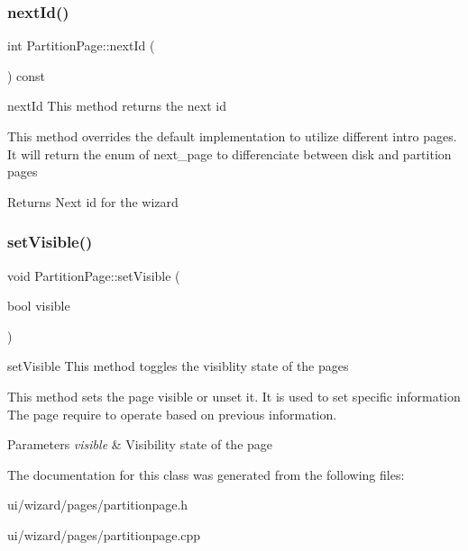 \subsubsection{\texorpdfstring{next\+Id()}{nextId()}}
{\footnotesize\ttfamily int Partition\+Page\+::next\+Id (\begin{DoxyParamCaption}{ }\end{DoxyParamCaption}) const\hspace{0.3cm}{\ttfamily [override]}}



next\+Id This method returns the next id 

This method overrides the default implementation to utilize different intro pages. It will return the enum of next\+\_\+page to differenciate between disk and partition pages \begin{DoxyReturn}{Returns}
Next id for the wizard 
\end{DoxyReturn}
\mbox{\label{classui_1_1wizard_1_1pages_1_1_partition_page_a105573c5cd7af63d8425672c45d2540f}} 
\subsubsection{\texorpdfstring{set\+Visible()}{setVisible()}}
{\footnotesize\ttfamily void Partition\+Page\+::set\+Visible (\begin{DoxyParamCaption}\item[{bool}]{visible }\end{DoxyParamCaption})\hspace{0.3cm}{\ttfamily [override]}}



set\+Visible This method toggles the visiblity state of the pages 

This method sets the page visible or unset it. It is used to set specific information The page require to operate based on previous information. 
\begin{DoxyParams}{Parameters}
{\em visible} & Visibility state of the page \\
\hline
\end{DoxyParams}


The documentation for this class was generated from the following files\+:\begin{DoxyCompactItemize}
\item 
ui/wizard/pages/partitionpage.\+h\item 
ui/wizard/pages/partitionpage.\+cpp\end{DoxyCompactItemize}
